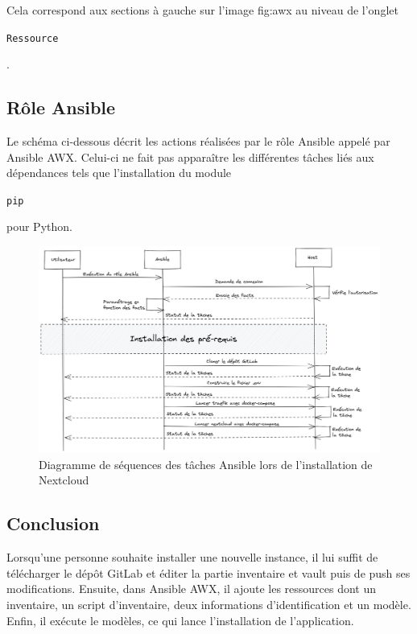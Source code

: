 \documentclass[12pt, a4paper, twoside]{article}
\begin{document}
Cela correspond aux sections à gauche sur l'image \refname{fig:awx} au niveau de l'onglet \begin{code}\texttt{Ressource}\end{code}.

\subsection{Rôle Ansible}
Le schéma ci-dessous décrit les actions réalisées par le rôle \gls{Ansible} appelé par \gls{Ansible} AWX. 
Celui-ci ne fait pas apparaître les différentes tâches liés aux dépendances tels que l'installation du module \begin{code}\texttt{pip}\end{code} pour Python.

\begin{figure}[!ht]
    \centering
    \includegraphics[width=\textwidth]{src/graph_ansible_nextcloud.png}
    \caption{Diagramme de séquences des tâches \gls{Ansible} lors de l'installation de \gls{Nextcloud}}
    \label{fig:nextcloud_ansible}
\end{figure}

\newpage
\subsection{Conclusion}
Lorsqu'une personne souhaite installer une nouvelle instance, il lui suffit de télécharger le dépôt \gls{GitLab} et éditer la partie inventaire et vault puis de push ses modifications. 
Ensuite, dans \gls{Ansible} AWX, il ajoute les ressources dont un inventaire, un script d'inventaire, deux informations d'identification et un modèle. 
Enfin, il exécute le modèles, ce qui lance l'installation de l'application.
\end{document}
